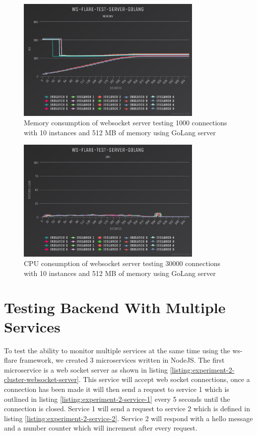 \begin{figure}[H]
  \centering
    \includegraphics[width=0.8\textwidth]{figures/experiments/experiment-1/golang/memory-30000-512-10.png}
    \caption{Memory consumption of websocket server testing 1000 connections with 10 instances and 512 MB of memory using GoLang server}
    \label{fig:experiment-1-golang-memory-30000-512-10}
\end{figure}

\begin{figure}[H]
  \centering
    \includegraphics[width=0.8\textwidth]{figures/experiments/experiment-1/golang/cpu-30000-512-10.png}
    \caption{CPU consumption of websocket server testing 30000 connections with 10 instances and 512 MB of memory using GoLang server}
    \label{fig:experiment-1-golang-cpu-30000-512-10}
\end{figure}

\section{Testing Backend With Multiple Services}

To test the ability to monitor multiple services at the same time using the ws-flare framework, we created 3 microservices written in NodeJS. The first microservice is a web socket server as shown in listing \ref{listing:experiment-2-cluster-websocket-server}. This service will accept web socket connections, once a connection has been made it will then send a request to service 1 which is outlined in listing \ref{listing:experiment-2-service-1} every 5 seconds until the connection is closed. Service 1 will send a request to service 2 which is defined in listing \ref{listing:experiment-2-service-2}. Service 2 will respond with a hello message and a number counter which will increment after every request.

